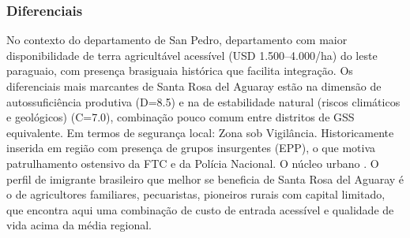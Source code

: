 \subsubsection*{Diferenciais}\label{dif-santa-rosa-del-aguaray-0218}
No contexto do departamento de San Pedro, departamento com maior disponibilidade de terra agricultável acessível (USD 1.500–4.000/ha) do leste paraguaio, com presença brasiguaia histórica que facilita integração. Os diferenciais mais marcantes de Santa Rosa del Aguaray estão na dimensão de autossuficiência produtiva (D=8.5) e na de estabilidade natural (riscos climáticos e geológicos) (C=7.0), combinação pouco comum entre distritos de GSS equivalente. Em termos de segurança local: Zona sob Vigilância. Historicamente inserida em região com presença de grupos insurgentes (EPP), o que motiva patrulhamento ostensivo da FTC e da Polícia Nacional. O núcleo urbano . O perfil de imigrante brasileiro que melhor se beneficia de Santa Rosa del Aguaray é o de agricultores familiares, pecuaristas, pioneiros rurais com capital limitado, que encontra aqui uma combinação de custo de entrada acessível e qualidade de vida acima da média regional.
